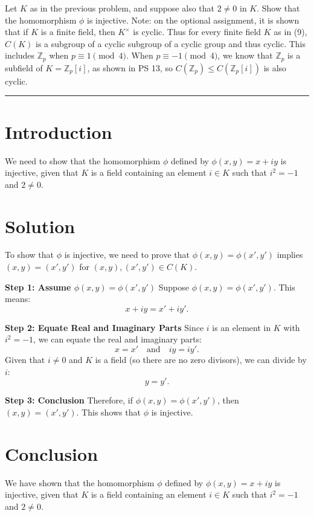 \documentclass[12pt]{amsart}
\theoremstyle{definition}
\numberwithin{equation}{section}
\newcommand{\Z}{\mathbb{Z}}
\begin{document}
\newpage
\begin{exercise}{9} Let \(K\) as in the previous problem, and suppose also that \(2 \neq 0 \) in \(K\). Show that the homomorphism \(\phi \) is injective. Note: on the optional assignment, it is shown that if \(K \) is a finite field, then \(K^{\times}\) is cyclic. Thus for every finite field \(K\) as in (9), \(C(K)\) is a subgroup of a cyclic subgroup of a cyclic group and thus cyclic. This includes \(\Z_p\) when \(p \equiv 1 \pmod 4\). When \(p \equiv -1 \pmod 4\), we know that \(\Z_p\) is a subfield of \(K = \Z_p[i]\), as shown in PS 13, so \(C(\Z_p) \leq C(\Z_p[i])\) is also cyclic.

    \noindent\rule{\linewidth}{1pt}

    \section*{Introduction}
    We need to show that the homomorphism \(\phi \) defined by \(\phi(x,y) = x + iy\) is injective, given that \(K\) is a field containing an element \(i \in K\) such that \(i^2 = -1\) and \(2 \neq 0\).

    \section*{Solution}
    To show that \(\phi \) is injective, we need to prove that \(\phi(x,y) = \phi(x',y')\) implies \((x,y) = (x',y')\) for \((x,y), (x',y') \in C(K)\).

    \noindent \textbf{Step 1: Assume \(\phi(x,y) = \phi(x',y')\)}
    Suppose \(\phi(x,y) = \phi(x',y')\). This means:
    \[
    x + iy = x' + iy'.
    \]

    \noindent \textbf{Step 2: Equate Real and Imaginary Parts}
    Since \(i\) is an element in \(K\) with \(i^2 = -1\), we can equate the real and imaginary parts:
    \[
    x = x' \quad \text{and} \quad iy = iy'.
    \]
    Given that \(i \neq 0\) and \(K\) is a field (so there are no zero divisors), we can divide by \(i\):
    \[
    y = y'.
    \]

    \noindent \textbf{Step 3: Conclusion}
    Therefore, if \(\phi(x,y) = \phi(x',y')\), then \((x,y) = (x',y')\). This shows that \(\phi \) is injective.

    \section*{Conclusion}
    We have shown that the homomorphism \(\phi \) defined by \(\phi(x,y) = x + iy\) is injective, given that \(K\) is a field containing an element \(i \in K\) such that \(i^2 = -1\) and \(2 \neq 0\).

\end{exercise}
\newpage
\end{document}
